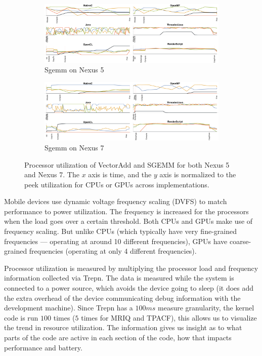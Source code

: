\begin{figure}
  \begin{subfigure}[b]{0.85\textwidth}
       \centering
       \includegraphics[width=\textwidth]{data/load_sgemm_nexus5.pdf}
       \vspace{-5mm}
       \caption{Sgemm on Nexus 5}\label{fig:Sgemm5}
   \end{subfigure}
  \begin{subfigure}[b]{0.85\textwidth}
       \centering
       \includegraphics[width=\textwidth]{data/load_sgemm_nexus7.pdf}
       \vspace{-5mm}
       \caption{Sgemm on Nexus 7}\label{fig:Sgemm7}
   \end{subfigure}


  \caption{Processor utilization of VectorAdd and SGEMM for both Nexus 5 and Nexus 7. The $x$ axis is time, and the $y$ axis is normalized to the peek utilization for CPUs or GPUs across implementations.}
  \label{fig:loadVecAddSgemm}
\end{figure}

Mobile devices use dynamic voltage frequency scaling (DVFS)
  to match performance to power utilization.
The frequency is increased for the processors when the load goes over a certain
  threshold.
Both CPUs and GPUs make use of frequency scaling. But unlike CPUs (which typically
  have very fine-grained frequencies --- operating at around 10 different frequencies), GPUs
  have coarse-grained frequencies (operating at only 4 different frequencies).  

Processor utilization is measured by multiplying the processor
  load and frequency information collected via Trepn.
The data is measured while the system is connected to a
  power source, which avoids the device going to sleep (it does add the
  extra overhead of the device communicating debug information with the development
  machine).
Since Trepn has a $100ms$ measure granularity, the kernel code is run $100$ times
  ($5$ times for MRIQ and TPACF), this allows us to visualize the trend in resource
  utilization.
The information gives us insight as to what parts of the code are active in each
	section of the code, how that impacts performance and battery.



